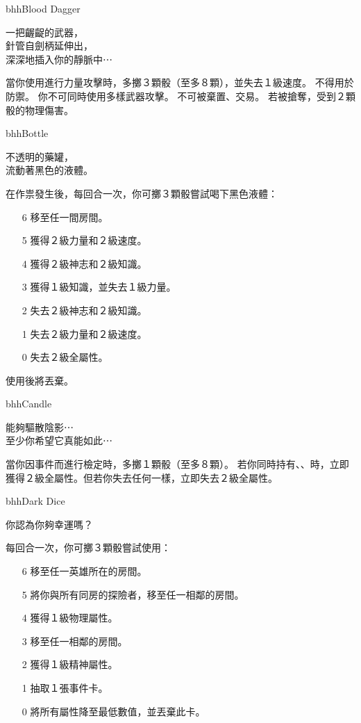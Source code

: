 %
\begin{ItemCard}{bhh}{Blood Dagger}%
  \begin{CardStory}
    一把齷齪的武器，\\
    針管自劍柄延伸出，\\
    深深地插入你的靜脈中⋯
  \end{CardStory}
  當你使用\ThisName{}進行力量攻擊時，多擲３顆骰（至多８顆），並失去１級速度。\smallskip
  \ThisName{}不得用於防禦。\smallskip
  你不可同時使用多樣武器攻擊。\smallskip
  \ThisName{}不可被棄置、交易。\smallskip
  若\ThisName{}被搶奪，受到２顆骰的物理傷害。\smallskip
\end{ItemCard}%
%
\begin{ItemCard}{bhh}{Bottle}
  \begin{CardStory}
    不透明的藥罐，\\
    流動著黑色的液體。
  \end{CardStory}
  在作祟發生後，每回合一次，你可擲３顆骰嘗試喝下黑色液體：
  \begin{itemize}
    \item[6] 移至任一間房間。
    \item[5] 獲得２級力量和２級速度。
    \item[4] 獲得２級神志和２級知識。
    \item[3] 獲得１級知識，並失去１級力量。
    \item[2] 失去２級神志和２級知識。
    \item[1] 失去２級力量和２級速度。
    \item[0] 失去２級全屬性。
  \end{itemize}
  使用後將\ThisName{}丟棄。\smallskip
\end{ItemCard}%
%
\begin{ItemCard}{bhh}{Candle}
  \begin{CardStory}
    能夠驅散陰影⋯\\
    至少你希望它真能如此⋯
  \end{CardStory}
  當你因事件而進行檢定時，多擲１顆骰（至多８顆）。\smallskip
  若你同時持有、、時，立即獲得２級全屬性。但若你失去任何一樣，立即失去２級全屬性。\smallskip
\end{ItemCard}%
%
\begin{ItemCard}{bhh}{Dark Dice}
  \begin{CardStory}
    你認為你夠幸運嗎？
  \end{CardStory}
  每回合一次，你可擲３顆骰嘗試使用\ThisName{}：
  \begin{itemize}
    \item[6] 移至任一英雄所在的房間。
    \item[5] 將你與所有同房的探險者，移至任一相鄰的房間。
    \item[4] 獲得１級物理屬性。
    \item[3] 移至任一相鄰的房間。
    \item[2] 獲得１級精神屬性。
    \item[1] 抽取１張事件卡。
    \item[0] 將所有屬性降至最低數值，並丟棄此卡。
  \end{itemize}
\end{ItemCard}%
